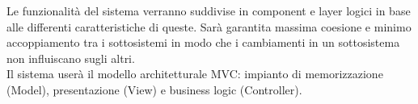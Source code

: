 


Le funzionalità del sistema verranno suddivise in component e layer logici in base alle differenti caratteristiche di queste. Sarà garantita massima coesione e minimo accoppiamento tra i sottosistemi in modo che i cambiamenti in un sottosistema non influiscano sugli altri.\\
Il sistema userà il modello architetturale MVC: impianto di memorizzazione (Model), presentazione (View) e business logic (Controller).